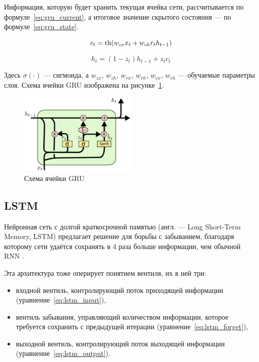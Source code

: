 Информация, которую будет хранить текущая ячейка сети, рассчитывается по формуле \ref*{eq:gru_current}, а итоговое значение скрытого состояния --- по формуле \ref*{eq:gru_state}.

\begin{equation}
    \label{eq:gru_current}
    c_t = \operatorname{th}(w_{cx}x_t+w_{ch}r_th_{t-1})
\end{equation}

\begin{equation}
    \label{eq:gru_state}
    h_t = (1-z_t)h_{t-1}+z_tc_t
\end{equation}

Здесь $\sigma(\cdot)$ --- сигмоида, а $w_{zx}$, $w_{zh}$, $w_{rx}$, $w_{rh}$, $w_{cx}$, $w_{ch}$ --- обучаемые параметры слоя.
Схема ячейки GRU изображена на рисунке \ref*{fig:gru}.

\begin{figure}[h]
    \centering
    \includegraphics[width=0.5\textwidth]{../inc/images/gru.png}
    \caption{Схема ячейки GRU}
    \label{fig:gru}
\end{figure}

\subsection{LSTM}

Нейронная сеть с долгой краткосрочной памятью (англ. --- Long Short-Term Memory, LSTM) предлагает решение для борьбы с забыванием, благодаря которому сети удаётся сохранять в 4 раза больше информации, чем обычной RNN \cite{art:rnn}.

Эта архитектура тоже оперирует понятием вентиля, их в ней три:
\begin{itemize}
    \item входной вентиль, контролирующий поток приходящей информации (уравнение \ref*{eq:lstm_input}),
    \item вентиль забывания, управляющий количеством информации, которое требуется сохранить с предыдущей итерации (уравнение \ref*{eq:lstm_forget}),
    \item выходной вентиль, контролирующий поток выходящей информации (уравнение \ref*{eq:lstm_output}).
\end{itemize}


